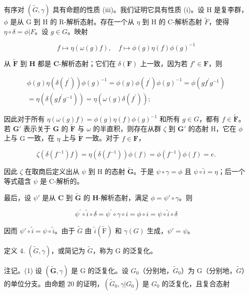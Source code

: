 有序对 \((\tilde{G},\gamma)\) 具有命题的性质 (iii)。我们证明它具有性质 (i)。设 H 是复李群，\(\phi\) 是从 G 到 H 的 R-解析态射。存在一个从 \(\eta\) 到 H 的 C-解析态射 \(\tilde{F}\)，使得 \(\eta \circ \delta = \phi |F\)。设 \(g\in G\)。映射

\[
f \mapsto \eta (\omega (g) f), \quad f \mapsto \phi (g) \eta (f) \phi (g) ^ {- 1}
\]

从 \(\tilde{\mathbf{F}}\) 到 \(\mathbf{H}\) 都是 \(\mathbf{C}\)-解析态射；它们在 \(\delta(\mathbf{F})\) 上一致，因为若 \(f' \in \mathbf{F}\)，则

\[
\begin{array}{r} \phi (g) \eta (\delta (f ^ {\prime})) \phi (g) ^ {- 1} = \phi (g) \phi (f ^ {\prime}) \phi (g) ^ {- 1} = \phi (g f ^ {\prime} g ^ {- 1}) \\ = \eta (\delta (g f ^ {\prime} g ^ {- 1})) = \eta (\omega (g) \delta (f ^ {\prime})); \end{array}
\]

因此对于所有 \(\eta (\omega (g)f) = \phi (g)\eta (f)\phi (g)^{-1}\) 和所有 \(g\in G\)，都有 \(f\in \tilde{\mathbf{F}}\)。若 \(\mathbf{G}'\) 表示关于 \(\mathbf{G}\) 的 \(\tilde{\mathbf{F}}\) 与 \(\omega\) 的半直积，则存在从群 \(\zeta\) 到 \(\mathbf{G}'\) 的态射 \(\mathrm{H}\)，它在 \(\phi\) 上与 \(\mathrm{G}\) 一致，在 \(\eta\) 上与 \(\tilde{\mathbf{F}}\) 一致。对于 \(f\in \mathbf{F}\)，

\[
\zeta (\delta (f ^ {- 1}) f) = \eta (\delta (f ^ {- 1})) \phi (f) = \phi (f ^ {- 1}) \phi (f) = e.
\]

因此 \(\zeta\) 在取商后定义出从 \(\psi\) 到 H 的态射 \(\tilde{\mathbf{G}}\)。于是 \(\psi \circ \gamma = \phi\) 且 \(\psi \circ \tilde{i} = \eta\)；后一个等式蕴含 \(\psi\) 是 C-解析的。

最后，设 \(\psi'\) 是从 \(\mathbf{C}\) 到 \(\tilde{\mathbf{G}}\) 的 \(\mathbf{H}\)-解析态射，满足 \(\phi = \psi' \circ \gamma\)。则

\[
\psi^ {\prime} \circ \tilde {i} \circ \delta = \psi^ {\prime} \circ \gamma \circ i = \phi \circ i = \psi \circ \tilde {i} \circ \delta
\]

因而 \(\psi' \circ \tilde{i} = \psi \circ \tilde{i}\)。由于 \(\tilde{G}\) 由 \(\tilde{i}(\tilde{\mathrm{F}})\) 和 \(\gamma(G)\) 生成，\(\psi' = \psi\)。

定义 4. \((\tilde{G},\gamma)\)，或简记为 \(\tilde{G}\)，称为 G 的泛复化。

注记。(1) 设 \((\tilde{\mathbf{G}},\gamma)\) 是 G 的泛复化。设 \(G_0\)（分别地，\(\tilde{G}_0\)）为 G（分别地，\(\tilde{G}\)）的单位分支。由命题 20 的证明，\((\tilde{G}_0,\gamma |G_0)\) 是 \(G_0\) 的泛复化，且复合态射

